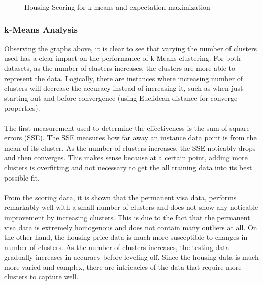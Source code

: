 \documentclass[h]{article}
\begin{document}
\begin{figure}[H]
      \caption*{Housing Scoring for k-means and expectation maximization} 
   \endminipage\hfill
\end{figure}

\subsubsection*{k-Means Analysis}
Observing the graphs above, it is clear to see that varying the number of clusters used 
has a clear impact on the performance of k-Means clustering.  For both datasets, as the number of 
clusters increases, the clusters are more able to represent the data. Logically, 
there are instances where increasing number of clusters will decrease the 
accuracy instead of increasing it, such as when just starting out and before 
convergence (using Euclidean distance for converge properties).
\\ \\
The first measurement used to determine the effectiveness is the sum of square 
errors (SSE).  The SSE measures how far away an instance data point is from the mean of its cluster.
As the number of clusters increases, the SSE noticably drops and then converges.  This 
makes sense because at a certain point, adding more clusters is overfitting and 
not necessary to get the all training data into its best possible fit.
\\ \\ 
From the scoring data, it is shown that the permanent visa data, performs remarkably well with a small number of 
clusters and does not show any noticable improvement by increasing clusters.  
This is due to the fact that the permanent visa data is extremely homogenous and 
does not contain many outliers at all.   On the other hand, the housing price 
data is much more susceptible to changes in number of clusters.  As the number 
of clusters increases, the testing data gradually increases in accuracy before leveling off.  
Since the housing data is much more varied and complex, there are intricacies of 
the data that require more clusters to capture well.
\end{document}
